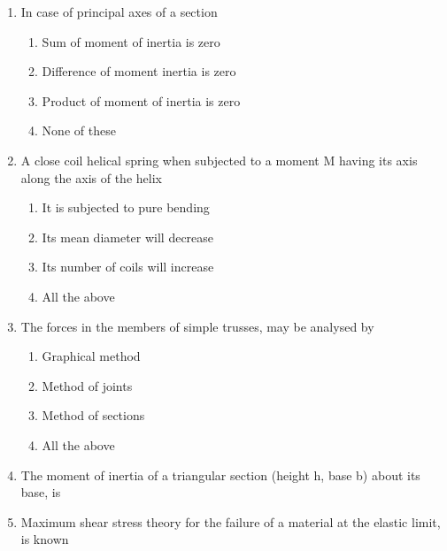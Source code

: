 \documentclass[11pt,a4paper]{article}
\begin{document}
\begin{enumerate}
\item{In case of principal axes of a section}
\begin{enumerate}[label=\Alph*.]
\item{Sum of moment of inertia is zero}
\item{Difference of moment inertia is zero}
\item{Product of moment of inertia is zero}
\item{None of these}
\end{enumerate}
\item{A close coil helical spring when subjected to a moment M having its axis along the axis of the helix}
\begin{enumerate}[label=\Alph*.]
\item{It is subjected to pure bending}
\item{Its mean diameter will decrease}
\item{Its number of coils will increase}
\item{All the above}
\end{enumerate}
\item{The forces in the members of simple trusses, may be analysed by}
\begin{enumerate}[label=\Alph*.]
\item{Graphical method}
\item{Method of joints}
\item{Method of sections}
\item{All the above}
\end{enumerate}
\item{The moment of inertia of a triangular section (height h, base b) about its base, is}
\\
\item{Maximum shear stress theory for the failure of a material at the elastic limit, is known}
\begin{enumerate}[label=\Alph*.]

\end{enumerate}
\end{enumerate}
\end{document}
